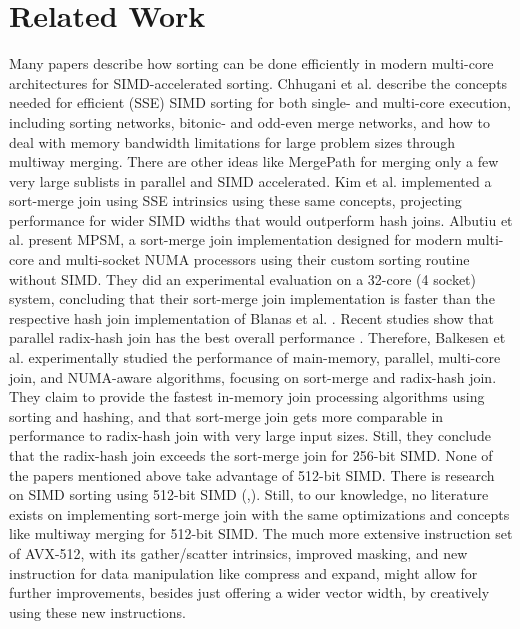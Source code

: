 \section{Related Work}
\label{sec:related-work}


Many papers describe how sorting can be done efficiently in modern multi-core architectures for
SIMD-accelerated sorting. Chhugani et al. \cite{10.14778/1454159.1454171} describe the concepts 
needed for efficient (SSE) SIMD sorting for both single- and multi-core execution, including sorting
networks, bitonic- and odd-even merge networks, and how to deal with memory bandwidth limitations 
for large problem sizes through multiway merging. There are other ideas like MergePath \cite{MergePath}
for merging only a few very large sublists in parallel and SIMD accelerated.
Kim et al. \cite{10.14778/1687553.1687564} implemented a sort-merge join using SSE intrinsics using these same 
concepts, projecting performance for wider SIMD widths that would outperform hash joins. Albutiu 
et al. \cite{MPSM} present MPSM, a sort-merge join implementation designed for modern multi-core and
multi-socket NUMA processors using their custom sorting routine without SIMD. They did an
experimental evaluation on a 32-core (4 socket) system, concluding that their sort-merge join
implementation is faster than the respective hash join implementation of Blanas et al. \cite{10.1145/1989323.1989328}. 
Recent studies show that parallel radix-hash join has the best overall performance \cite{6544839}. Therefore,
Balkesen et al. \cite{Balkesen} experimentally studied the performance of main-memory, parallel,
multi-core join, and NUMA-aware algorithms, focusing on sort-merge and radix-hash join.
They claim to provide the fastest in-memory join processing algorithms using sorting and hashing,
and that sort-merge join gets more comparable in performance to radix-hash join with very large 
input sizes. Still, they conclude that the radix-hash join exceeds the sort-merge join for 256-bit
SIMD. None of the papers mentioned above take advantage of 512-bit SIMD. There is research on SIMD
sorting using 512-bit SIMD (\cite{Watkins},\cite{8855628}). Still, to our knowledge, no literature 
exists on implementing sort-merge join with the same optimizations and concepts like
multiway merging for 512-bit SIMD.
The much more extensive instruction set of AVX-512, with its gather/scatter intrinsics, improved
masking, and new instruction for data manipulation like compress and expand, might allow for
further improvements, besides just offering a wider vector width, by creatively using these new
instructions.
